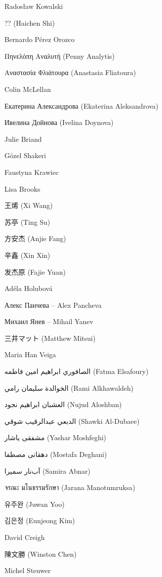 \begin{preamble}

Rados\l{}aw Kowalski

?? (Haichen Shi)

Bernardo P\'{e}rez Orozco

Πηνελόπη Αναλυτή (Penny Analytis)

Αναστασία Φλιάτουρα (Anastasia Fliatoura)

Colin McLellan

Екатерина Александрова (Ekaterina Aleksandrova)

Ивелина Дойнова (Ivelina Doynova)

Julie Briand

G\"{o}zel Shakeri

Faustyna Krawiec

Lisa Brooks

{\asianfont 王烯} (Xi Wang)

{\asianfont 苏亭} (Ting Su)

{\asianfont 方安杰} (Anjie Fang)

{\asianfont 辛鑫} (Xin Xin)

{\asianfont 发杰原} (Fajie Yuan)

Ad\'{e}la Holubov\'{a}

Алекс Панчева -- Alex Pancheva

Михаил Янев -- Mihail Yanev

{\asianfont 三井マット} (Matthew Mitsui)

Maria Han Veiga

{\arabicfont الصافوري ابراهيم امين فاطمه} (Fatma Elsafoury)

{\arabicfont  الخوالدة سليمان رامي} (Rami Alkhawaldeh)

{\arabicfont العشبان ابراهيم نجود} (Nujud Aloshban)

{\arabicfont الدبعي عبدالرقيب شوقي} (Shawki Al-Dubaee)

{\farsifont مشفقى ياشار} (Yashar Moshfeghi)

{\farsifont دهقانی مصطفا} (Mostafa Deghani)

{\farsifont آب‌نار سمیرا} (Samira Abnar)

{\thaifont \Large จรณะ มโนธรรมรักษา} (Jarana Manotumruksa)

{\asianfont 유주완} (Juwan Yoo)

{\asianfont 김은정} (Eunjeong Kim)

David Creigh

{\asianfont 陳文勝} (Winston Chen)

Michel Steuwer


\end{preamble}
